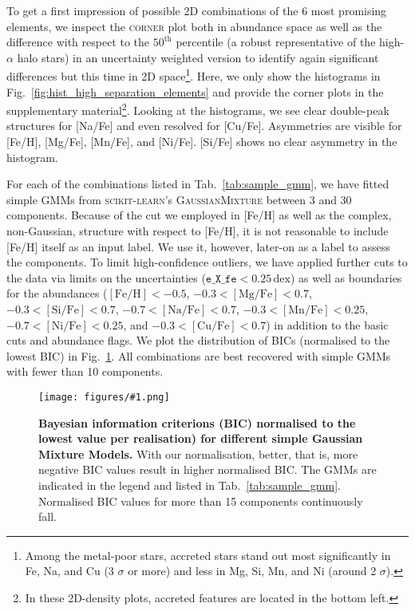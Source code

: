 \documentclass[fleqn,usenatbib]{mnras}
\newcommand{\dex}{\,\mathrm{dex}}	%
\newcommand{\codeicon}{{\faCloudDownload}}
\newcommand{\codelink}[1]{\href{https://github.com/svenbuder/Accreted-stars-in-GALAH-DR3/tree/main/figures/#1.ipynb}{\codeicon}\,\,}
\newcommand{\oscaption}[2]{\caption{#2 \codelink{#1}}}
\newcommand{\figurecolumnwidth}[3]{\begin{figure} \centering \texttt{[image: figures/\#1.png]}\oscaption{#2}{#3}\label{fig:#1} \end{figure}}
\begin{document}
To get a first impression of possible 2D combinations of the 6 most promising elements, we inspect the \textsc{corner} plot \citep{corner} both in abundance space as well as the difference with respect to the $50^\text{th}$ percentile (a robust representative of the high-$\alpha$ halo stars) in an uncertainty weighted version to identify again significant differences but this time in 2D space\footnote{Among the metal-poor stars, accreted stars stand out most significantly in Fe, Na, and Cu (3 $\sigma$ or more) and less in Mg, Si, Mn, and Ni (around 2 $\sigma$).}. Here, we only show the histograms in Fig.~\ref{fig:hist_high_separation_elements} and provide the corner plots in the supplementary material\footnote{In these 2D-density plots, accreted features are located in the bottom left.}. Looking at the histograms, we see clear double-peak structures for [Na/Fe] and even resolved for [Cu/Fe]. Asymmetries are visible for [Fe/H], [Mg/Fe], [Mn/Fe], and [Ni/Fe]. [Si/Fe] shows no clear asymmetry in the histogram.

For each of the combinations listed in Tab.~\ref{tab:sample_gmm}, we have fitted simple GMMs from \textsc{scikit-learn}'s \textsc{GaussianMixture} between 3 and 30 components. Because of the cut we employed in [Fe/H] as well as the complex, non-Gaussian, structure with respect to [Fe/H], it is not reasonable to include [Fe/H] itself as an input label. We use it, however, later-on as a label to assess the components. To limit high-confidence outliers, we have applied further cuts to the data via limits on the uncertainties ($\texttt{e\_X\_fe} < 0.25\dex$) as well as boundaries for the abundances ($ \mathrm{[Fe/H]} < -0.5 $, $-0.3 < \mathrm{[Mg/Fe]} < 0.7$,$ -0.3 < \mathrm{[Si/Fe]} < 0.7$, $ -0.7 < \mathrm{[Na/Fe]} < 0.7$, $ -0.3 < \mathrm{[Mn/Fe]} < 0.25$, $ -0.7 < \mathrm{[Ni/Fe]} < 0.25$, and $ -0.3 < \mathrm{[Cu/Fe]} < 0.7$) in addition to the basic cuts and abundance flags. We plot the distribution of BICs (normalised to the lowest BIC) in Fig.~\ref{fig:bic_stats}. All combinations are best recovered with simple GMMs with fewer than 10 components.

\figurecolumnwidth{bic_stats}{gaussian_mixture_models}{
\textbf{Bayesian information criterions (BIC) normalised to the lowest value per realisation) for different simple Gaussian Mixture Models.} With our normalisation, better, that is, more negative BIC values result in higher normalised BIC. The GMMs are indicated in the legend and listed in Tab.~\ref{tab:sample_gmm}. Normalised BIC values for more than 15 components continuously fall.
}
\end{document}
